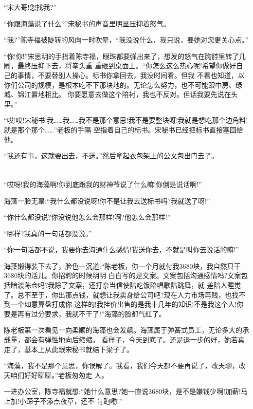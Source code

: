 \documentclass[11pt,a4paper,onecolumn]{article}
\begin{document}
``宋大哥!您找我?''

``你跟海藻说了什么?''宋秘书的声音里明显压抑着怒气。

``我?''陈寺福被陡转的风向一时吹晕，``我没说什么，我只说，要她对您更关心点。''

``你!你!''宋思明的手指着陈寺福，眼珠都要弹出来了，想发的怒气在胸腔里转了几圈，最终压抑下去，将拳头重
重砸到桌面上。``你怎么这么热心呢!希望你做好自己的事情，不要替别人操心。标书你拿回去，我没时间看。但我
不看也知道，以你们公司的规模，是根本吃不下那块地的。无论怎么努力，也不可能跟中房、绿城、锦江置地相比。
你要愿意去做这个陪衬，我也不反对。但话我要先说在头里。''

``哎!哎!宋秘书!我……我……我不是那个意思!我不是要整块呀!我就是想吃那个边角料!就是那个那个……''老板的手隔
空指着自己的标书。宋秘书已经把标书直接塞回给他。

``我还有事，这就要出去，不送。''然后拿起衣包架上的公文包出门去了。

\section[\thesection]{}

``哎呀!我的海藻啊!你到底跟我的财神爷说了什么嘛!你倒是说话啊!''

海藻一脸无辜:``我什么都没说呀!你不是让我去送标书吗?我就送了呀!''

``你什么都没说?你没说他怎么会那样!啊?他怎么会那样!''

``哪样?我真的一句话都没说。''

``你一句话都不说，我要你去沟通什么感情!我送你去，不就是叫你去说话的嘛!''

海藻懒得装下去了，脸色一沉道:``陈老板，你一个月就付我3680块，我自然只干3680块的活儿。你招聘的时候明明
白白写的是文案。文案包括沟通感情吗?文案包括暗渡陈仓吗?我除了文案，还打杂当信使陪吃饭陪唱歌陪跳舞，就
差陪人睡觉了。总不至于，你出那点钱，就想让我卖身给公司吧?现在人力市场再贱，也找不到一个如意算盘打成你
这样的!我挂价出售的是我十几年的知识!不是我这个人!你要是再有过分要求，我就不干了!''海藻的脸都气红了。

陈老板第一次看见一向柔顺的海藻也会发飙。海藻属于弹簧式员工，无论多大的承载量，都会有弹性地向后缩缩。
看样子，今天到底了。还是退一步的好，她若真走了，基本上从此跟宋秘书就结下梁子了。

``海藻，我不是那个意思，你误解了。我看，我们今天都不要再说了，改天聊，改天咱们好好聊聊。''老板匆匆走
人。

一进办公室，陈寺福就想:``她什么意思?她一直说3680块，是不是嫌钱少啊!加薪!马上加!小蹄子不添点夜草，还不
肯跑嘞!''
\end{document}
